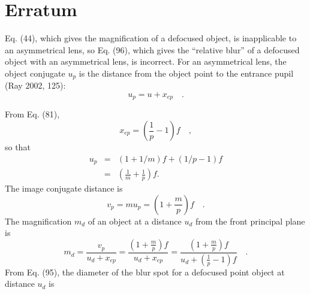 \documentclass[11pt, oneside]{scrartcl}   	%
\begin{document}
\appendix
\section{Erratum}

Eq. (44), which gives the magnification of a defocused object, is
inapplicable to an asymmetrical lens, so Eq. (96), which gives the
``relative blur'' of a defocused object with an asymmetrical lens, is incorrect.
For an asymmetrical lens, the object conjugate $u_p$ is the distance from the object point to the entrance pupil (Ray 2002, 125):
\begin{equation}
u_p = u + x_{ep}\quad .
\end{equation}

From Eq. (81),
\begin{equation}
x_{ep} =\left(\frac{1}{p}-1\right)f\quad,
\end{equation}
so that
\begin{eqnarray}
u_p &=&(1+1/m)f+ (1/p - 1)f\\
& = &\left(\frac{1}{m} + \frac{1}{p}\right)f.
\end{eqnarray}
The image conjugate distance is
\begin{equation}
v_p = mu_p=\left(1+ \frac{m}{p}\right)f\quad.
\end{equation}
The magnification $m_d$ of an object at a distance $u_d$ from the front principal plane is
\begin{equation}
m_d=\frac{v_p}{u_d + x_{ep}} = \frac{(1+\frac{m}{p})f}{ u_d + x_{ep}} = \frac{(1+\frac{m}{p})f}{u_d +(\frac{1}{p}-1)f} \quad.
\end{equation}
From Eq. (95), the diameter of the blur spot for a defocused point object at distance $u_d$ is
\end{document}
